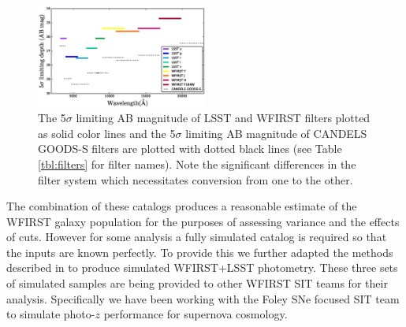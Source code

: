\begin{figure}
\centering
  \includegraphics[trim=0cm 0cm 0cm 0cm, clip,width=0.50\textwidth] {./plots/filters.eps}
\caption{The 5$\sigma$ limiting AB magnitude of LSST and WFIRST filters plotted
as solid color lines and the 5$\sigma$ limiting AB magnitude of CANDELS GOODS-S
filters are plotted with dotted black lines (see Table \ref{tbl:filters} for
filter names).  Note the significant differences in the filter system which
necessitates conversion from one to the other.}
\label{fig:filters}
\end{figure}

The combination of these catalogs produces a reasonable estimate of the WFIRST
galaxy population for the purposes of assessing variance and the effects of
cuts.  However for some analysis a fully simulated catalog is required so that
the inputs are known perfectly.  To provide this we further adapted the methods
described in \citet{stickley2016} to produce simulated WFIRST+LSST photometry.
These three sets of simulated samples are being provided to other WFIRST SIT
teams for their analysis. Specifically we have been working with the Foley SNe focused SIT
team to simulate photo-$z$ performance for supernova cosmology.


